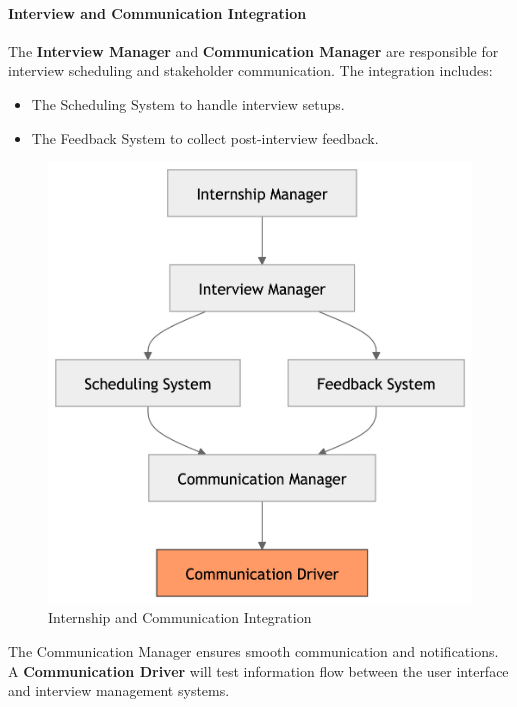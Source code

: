 \paragraph{Interview and Communication Integration}
The \textbf{Interview Manager} and \textbf{Communication Manager} are responsible for interview scheduling and stakeholder communication. The integration includes:
\begin{itemize}
    \item The Scheduling System to handle interview setups.
    \item The Feedback System to collect post-interview feedback.
\end{itemize}
\begin{figure}[H]
    \begin{center}
        \includegraphics[width=0.59\linewidth]{JhaBhatiaSharma/imagesDD/InterviewandCommunicationIntegration.png}
        \caption{Internship and Communication Integration}
        \label{fig:internshipManagement}
    \end{center}
\end{figure}
The Communication Manager ensures smooth communication and notifications. A \textbf{Communication Driver} will test information flow between the user interface and interview management systems.

